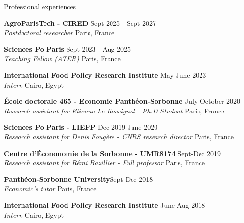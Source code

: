 \documentclass[
]{resume}
\begin{document}
\begin{small}
\begin{rSection}{Professional experiences}

\textbf{AgroParisTech - CIRED} \hfill{Sept 2025 - Sept 2027} \\
\textit{Postdoctoral researcher} \hfill {Paris, France}\\
\vspace{0.125cm}

\textbf{Sciences Po Paris} \hfill{Sept 2023 - Aug 2025} \\
\textit{Teaching Fellow (ATER)} \hfill {Paris, France}\\
\vspace{0.125cm}

\textbf{International Food Policy Research Institute} \hfill{May-June 2023} \\
\textit{Intern} \hfill {Cairo, Egypt}\\
\vspace{0.125cm}

\textbf{\'Ecole doctorale 465 - Economie Panth\'eon-Sorbonne} \hfill {July-October 2020} \\
\textit{Research assistant for \href{https://etiennelerossignol.wordpress.com/}{Etienne Le Rossignol} - Ph.D Student} \hfill {Paris, France}\\
\vspace{0.125cm}

\textbf{Sciences Po Paris - LIEPP} \hfill {Dec 2019-June 2020} \\
\textit{Research assistant for \href{https://scholar.google.fr/citations?user=FC7RktsAAAAJ&hl=fr}{Denis Fougère} - CNRS research director} \hfill {Paris, France} \\
\vspace{0.125cm}

\textbf{Centre d'\'Econonomie de la Sorbonne - UMR8174} \hfill{Sept-Dec 2019} \\
\textit{Research assistant for \href{https://scholar.google.com/citations?user=-IXkBZAAAAAJ\&hl=fr}{Rémi Bazillier} - Full professor} \hfill {Paris, France}\\
\vspace{0.125cm}

\textbf{Panth\'{e}on-Sorbonne University}\hfill{Sept-Dec 2018 } \\
\textit{Economic's tutor} \hfill {Paris, France}\\
\vspace{0.125cm}

\textbf{International Food Policy Research Institute} \hfill{June-Aug 2018} \\
\textit{Intern} \hfill {Cairo, Egypt}\\
\end{rSection}
\vspace{0.2cm}


\end{small}
\end{document}
